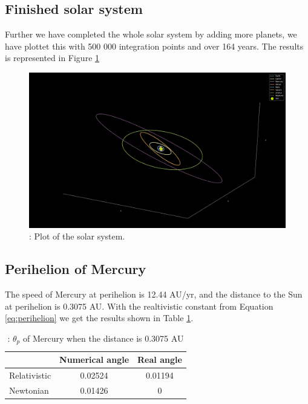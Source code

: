 \documentclass{article}
\begin{document}
\subsection{Finished solar system}
Further we have completed the whole solar system by adding more planets, we have plottet this with 500 000 integration points and over 164 years. The results is represented in Figure \ref{fig:solar}

\begin{figure}[H]
    \begin{center}
        \includegraphics[width=1.2\textwidth]{./Plot/Solar_System.png}
        \caption{: Plot of the solar system.}
        \label{fig:solar}
    \end{center}
\end{figure}


\subsection{Perihelion of Mercury}
The speed of Mercury at perihelion is 12.44 AU/yr, and the distance to the Sun at perihelion is 0.3075 AU. With the realtivistic constant from Equation \ref{eq:perihelion} we get the results shown in Table \ref{tab:perihelion}.

\begin{table}[h!]
    \caption{: $\theta_p$ of Mercury when the distance is 0.3075 AU}
    \label{tab:perihelion}
    \centering
    \begin{tabular}{l c c}

              & Numerical angle & Real angle\\
        \hline
        Relativistic    & 0.02524 & 0.01194 \\
        Newtonian   & 0.01426  &  0 \\
        \hline
    \end{tabular}
\end{table}
\end{document}
